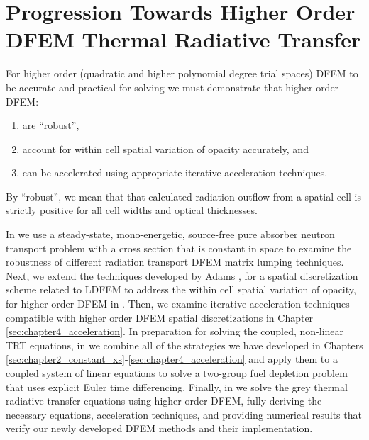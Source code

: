 \section{Progression Towards Higher Order DFEM Thermal Radiative Transfer}

For higher order (quadratic and higher polynomial degree trial spaces) DFEM to be accurate and practical for solving  we must demonstrate that higher order DFEM:
\begin{enumerate}
\item are ``robust'',
\item account for within cell spatial variation of opacity accurately, and
\item can be accelerated using appropriate iterative acceleration techniques.
\end{enumerate}
By ``robust'', we mean that that calculated radiation outflow from a spatial cell is strictly positive for all cell widths and optical thicknesses.

In  we use a steady-state, mono-energetic, source-free pure absorber neutron transport problem with a cross section that is constant in space to examine the robustness of different radiation transport DFEM matrix lumping techniques.
Next, we extend the techniques developed by Adams \cite{adams_scb,adams_nowak}, for a spatial discretization scheme related to LDFEM  to address the within cell spatial variation of opacity, for higher order DFEM in  .
Then, we examine iterative acceleration techniques compatible with higher order DFEM spatial discretizations in Chapter \ref{sec:chapter4_acceleration}.
In preparation for solving the coupled, non-linear TRT equations, in  we combine all of the strategies we have developed in Chapters \ref{sec:chapter2_constant_xs}-\ref{sec:chapter4_acceleration} and apply them to a coupled system of linear equations to solve a two-group fuel depletion problem that uses explicit Euler time differencing.
Finally, in  we solve the grey thermal radiative transfer equations using higher order DFEM, fully deriving the necessary  equations, acceleration techniques, and providing numerical results that verify our newly developed DFEM methods and their implementation. 

